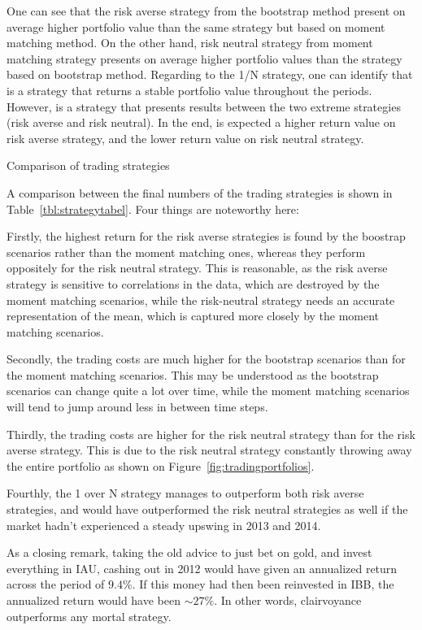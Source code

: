 One can see that the risk averse strategy from the bootstrap method present on average higher portfolio value than the same strategy but based on moment matching method.
On the other hand, risk neutral strategy from moment matching strategy presents on average higher portfolio values than the strategy based on bootstrap method.
Regarding to the 1/N strategy, one can identify that is a strategy that returns a stable portfolio value throughout the periods.
However, is a strategy that presents results between the two extreme strategies (risk averse and risk neutral).
In the end, is expected a higher return value on risk averse strategy, and the lower return value on risk neutral strategy.


\begin{table}[tpb]
\caption{Comparison of trading strategies}\label{tbl:strategytabel}
\centering

\end{table}


A comparison between the final numbers of the trading strategies is shown in Table~\ref{tbl:strategytabel}.
Four things are noteworthy here:

Firstly, the highest return for the risk averse strategies is found by the boostrap scenarios rather than the moment matching ones, whereas they perform oppositely for the risk neutral strategy.
This is reasonable, as the risk averse strategy is sensitive to correlations in the data, which are destroyed by the moment matching scenarios, while the risk-neutral strategy needs an accurate representation of the mean, which is captured more closely by the moment matching scenarios.

Secondly, the trading costs are much higher for the bootstrap scenarios than for the moment matching scenarios.
This may be understood as the bootstrap scenarios can change quite a lot over time, while the moment matching scenarios will tend to jump around less in between time steps.

Thirdly, the trading costs are higher for the risk neutral strategy than for the risk averse strategy. This is due to the risk neutral strategy constantly throwing away the entire portfolio as shown on Figure~\ref{fig:tradingportfolios}.

Fourthly, the 1 over N strategy manages to outperform both risk averse strategies, and would have outperformed the risk neutral strategies as well if the market hadn't experienced a steady upswing in 2013 and 2014.

As a closing remark, taking the old advice to just bet on gold, and invest everything in IAU, cashing out in 2012 would have given an annualized return across the period of $9.4 \%$. If this money had then been reinvested in IBB, the annualized return would have been $\sim 27 \%$.
In other words, clairvoyance outperforms any mortal strategy.